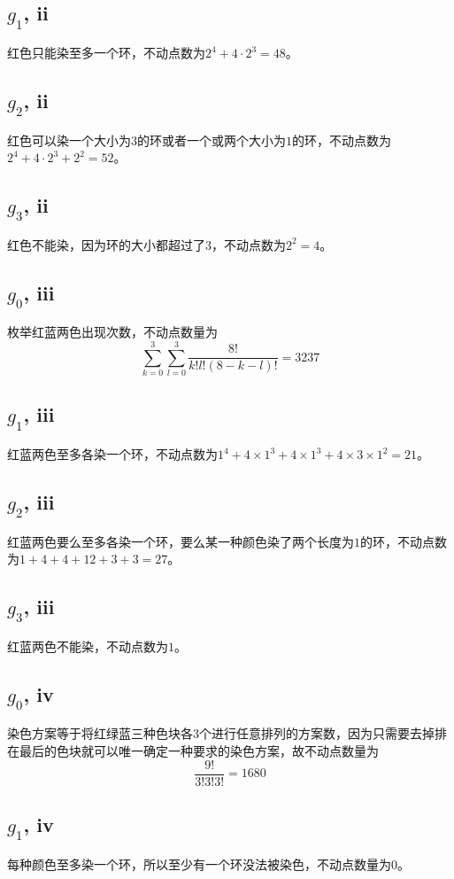 \documentclass[8pt]{article}
\begin{document}
\subsection{$g_1$, ii}\label{ii1}
红色只能染至多一个环，不动点数为$2^4 + 4 \cdot 2^3 = 48$。
\subsection{$g_2$, ii}\label{ii2}
红色可以染一个大小为$3$的环或者一个或两个大小为$1$的环，不动点数为$2^4 + 4 \cdot 2^3 + 2^2 = 52$。
\subsection{$g_3$, ii}\label{ii3}
红色不能染，因为环的大小都超过了$3$，不动点数为$2^2 = 4$。

\subsection{$g_0$, iii}\label{iii0}
枚举红蓝两色出现次数，不动点数量为
\begin{equation}
\sum_{k=0}^{3}\sum_{l=0}^{3}\frac{8!}{k!l!(8-k-l)!} = 3237
\end{equation}
\subsection{$g_1$, iii}\label{iii1}
红蓝两色至多各染一个环，不动点数为$1^4 + 4 \times 1^3 + 4 \times 1^3 + 4 \times 3 \times 1^2 = 21$。
\subsection{$g_2$, iii}\label{iii2}
红蓝两色要么至多各染一个环，要么某一种颜色染了两个长度为$1$的环，不动点数为$1 + 4 + 4 + 12 + 3 + 3 = 27$。
\subsection{$g_3$, iii}\label{iii3}
红蓝两色不能染，不动点数为$1$。
\subsection{$g_0$, iv}\label{iv0}
染色方案等于将红绿蓝三种色块各$3$个进行任意排列的方案数，因为只需要去掉排在最后的色块就可以唯一确定一种要求的染色方案，故不动点数量为
\begin{equation}
\frac{9!}{3!3!3!} = 1680
\end{equation}
\subsection{$g_1$, iv}\label{iv1}
每种颜色至多染一个环，所以至少有一个环没法被染色，不动点数量为$0$。
\end{document}
